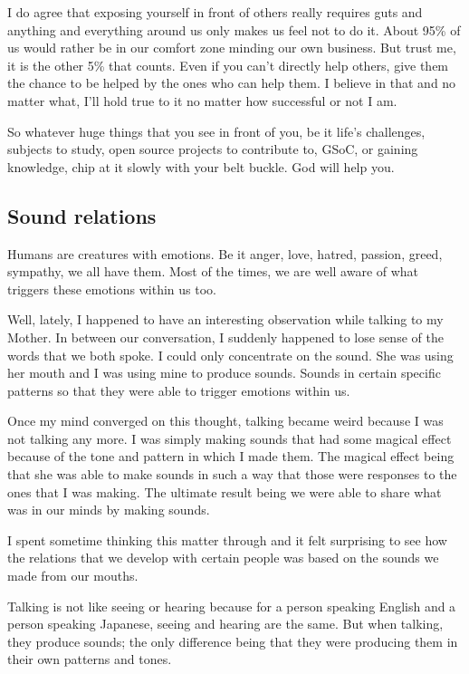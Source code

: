 \documentclass[twoside,11pt]{article}
\begin{document}
I do agree that exposing yourself in front of others really requires guts and anything and everything around us only makes us feel not to do it. About 95\% of us would rather be in our comfort zone minding our own business. But trust me, it is the other 5\% that counts. Even if you can't directly help others, give them the chance to be helped by the ones who can help them. I believe in that and no matter what, I'll hold true to it no matter how successful or not I am.

So whatever huge things that you see in front of you, be it life's challenges, subjects to study, open source projects to contribute to, GSoC, or gaining knowledge, chip at it slowly with your belt buckle. God will help you.

\newpage
\begin{center}
  \section{Sound relations}
\end{center}
\bigskip
\bigskip
\bigskip

Humans are creatures with emotions. Be it anger, love, hatred, passion, greed, sympathy, we all have them. Most of the times, we are well aware of what triggers these emotions within us too.

Well, lately, I happened to have an interesting observation while talking to my Mother. In between our conversation, I suddenly happened to lose sense of the words that we both spoke. I could only concentrate on the sound. She was using her mouth and I was using mine to produce sounds. Sounds in certain specific patterns so that they were able to trigger emotions within us.

Once my mind converged on this thought, talking became weird because I was not talking any more. I was simply making sounds that had some magical effect because of the tone and pattern in which I made them. The magical effect being that she was able to make sounds in such a way that those were responses to the ones that I was making. The ultimate result being we were able to share what was in our minds by making sounds.

I spent sometime thinking this matter through and it felt surprising to see how the relations that we develop with certain people was based on the sounds we made from our mouths.

Talking is not like seeing or hearing because for a person speaking English and a person speaking Japanese, seeing and hearing are the same. But when talking, they produce sounds; the only difference being that they were producing them in their own patterns and tones.
\end{document}
